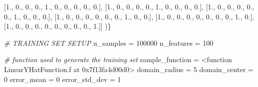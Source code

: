 \documentclass[11pt]{article}
\newenvironment{Shaded}{}{}
\newcommand{\DecValTok}[1]{\textcolor[rgb]{0.25,0.63,0.44}{{#1}}}
\newcommand{\BaseNTok}[1]{\textcolor[rgb]{0.25,0.63,0.44}{{#1}}}
\newcommand{\CommentTok}[1]{\textcolor[rgb]{0.38,0.63,0.69}{\textit{{#1}}}}
\newcommand{\NormalTok}[1]{{#1}}
\newcommand{\OperatorTok}[1]{\textcolor[rgb]{0.40,0.40,0.40}{{#1}}}
\begin{document}
\begin{Shaded}
\begin{Highlighting}[]
\NormalTok{        [}\DecValTok{1}\NormalTok{., }\DecValTok{0}\NormalTok{., }\DecValTok{0}\NormalTok{., }\DecValTok{0}\NormalTok{., }\DecValTok{1}\NormalTok{., }\DecValTok{0}\NormalTok{., }\DecValTok{0}\NormalTok{., }\DecValTok{0}\NormalTok{., }\DecValTok{0}\NormalTok{., }\DecValTok{0}\NormalTok{.],}
\NormalTok{        [}\DecValTok{1}\NormalTok{., }\DecValTok{0}\NormalTok{., }\DecValTok{0}\NormalTok{., }\DecValTok{0}\NormalTok{., }\DecValTok{0}\NormalTok{., }\DecValTok{1}\NormalTok{., }\DecValTok{0}\NormalTok{., }\DecValTok{0}\NormalTok{., }\DecValTok{0}\NormalTok{., }\DecValTok{0}\NormalTok{.],}
\NormalTok{        [}\DecValTok{1}\NormalTok{., }\DecValTok{0}\NormalTok{., }\DecValTok{0}\NormalTok{., }\DecValTok{0}\NormalTok{., }\DecValTok{0}\NormalTok{., }\DecValTok{0}\NormalTok{., }\DecValTok{1}\NormalTok{., }\DecValTok{0}\NormalTok{., }\DecValTok{0}\NormalTok{., }\DecValTok{0}\NormalTok{.],}
\NormalTok{        [}\DecValTok{1}\NormalTok{., }\DecValTok{0}\NormalTok{., }\DecValTok{0}\NormalTok{., }\DecValTok{0}\NormalTok{., }\DecValTok{0}\NormalTok{., }\DecValTok{0}\NormalTok{., }\DecValTok{0}\NormalTok{., }\DecValTok{1}\NormalTok{., }\DecValTok{0}\NormalTok{., }\DecValTok{0}\NormalTok{.],}
\NormalTok{        [}\DecValTok{1}\NormalTok{., }\DecValTok{0}\NormalTok{., }\DecValTok{0}\NormalTok{., }\DecValTok{0}\NormalTok{., }\DecValTok{0}\NormalTok{., }\DecValTok{0}\NormalTok{., }\DecValTok{0}\NormalTok{., }\DecValTok{0}\NormalTok{., }\DecValTok{1}\NormalTok{., }\DecValTok{0}\NormalTok{.],}
\NormalTok{        [}\DecValTok{1}\NormalTok{., }\DecValTok{0}\NormalTok{., }\DecValTok{0}\NormalTok{., }\DecValTok{0}\NormalTok{., }\DecValTok{0}\NormalTok{., }\DecValTok{0}\NormalTok{., }\DecValTok{0}\NormalTok{., }\DecValTok{0}\NormalTok{., }\DecValTok{0}\NormalTok{., }\DecValTok{1}\NormalTok{.]]}
\NormalTok{    )\}}

\CommentTok{# TRAINING SET SETUP}
\NormalTok{n_samples }\OperatorTok{=} \DecValTok{100000}
\NormalTok{n_features }\OperatorTok{=} \DecValTok{100}

\CommentTok{# function used to generate the training set}
\NormalTok{sample_function }\OperatorTok{=} \OperatorTok{<}\NormalTok{function LinearYHatFunction.f at }\BaseNTok{0x7f13fa4d00d0}\OperatorTok{>}
\NormalTok{domain_radius }\OperatorTok{=} \DecValTok{5}
\NormalTok{domain_center }\OperatorTok{=} \DecValTok{0}
\NormalTok{error_mean }\OperatorTok{=} \DecValTok{0}
\NormalTok{error_std_dev }\OperatorTok{=} \DecValTok{1}


\end{Highlighting}
\end{Shaded}
\end{document}
